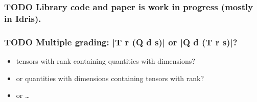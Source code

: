 \documentclass{article}
\begin{document}
\subsubsection{{\bfseries\sffamily TODO} Library code and paper is work in progress (mostly in Idris).}
\label{sec:org464cfe2}
\subsubsection{{\bfseries\sffamily TODO} Multiple grading: |T r (Q d s)| or |Q d (T r s)|?}
\label{sec:org77791a8}
\begin{itemize}
\item tensors with rank containing quantities with dimensions?
\item or quantities with dimensions containing tensors with rank?
\item or \ldots{}
\end{itemize}
\end{document}
